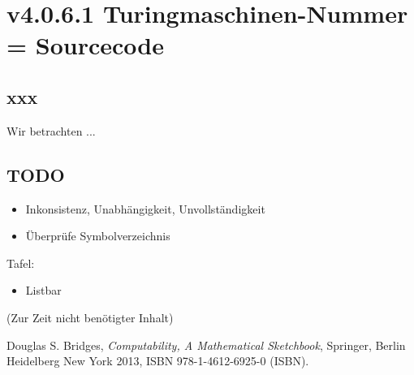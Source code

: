 \documentclass[a4paper]{amsart}
\theoremstyle{definition}
\begin{document}
\section{v4.0.6.1 Turingmaschinen-Nummer = Sourcecode}

\subsection{xxx}
Wir betrachten ... 

\begin{backup}
\section{TODO}

\begin{itemize}
   \item Inkonsistenz, Unabhängigkeit, Unvollständigkeit
\end{itemize}

\begin{itemize}
     \item Überprüfe Symbolverzeichnis
\end{itemize}

Tafel:
\begin{itemize}
   \item Listbar
\end{itemize}

\end{backup}

\begin{backup}
    (Zur Zeit nicht benötigter Inhalt)
\end{backup}

\begin{thebibliography}{9}
   Douglas S. Bridges, \emph{Computability, A Mathematical Sketchbook},
   Springer, Berlin Heidelberg New York 2013, ISBN 978-1-4612-6925-0 (ISBN).

\end{thebibliography}
\end{document}
